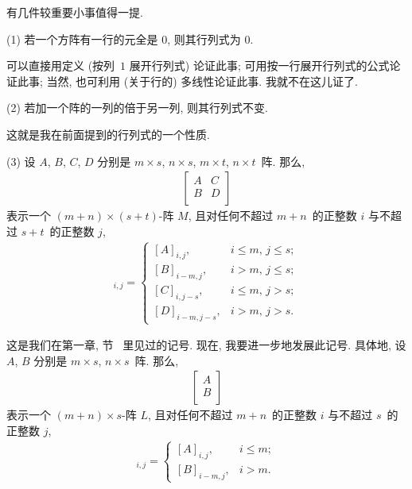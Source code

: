 有几件较重要小事值得一提.

(1)
若一个方阵有一行的元全是 \(0\),
则其行列式为 \(0\).

可以直接用定义 (按列~\(1\) 展开行列式) 论证此事;
可用按一行展开行列式的公式论证此事;
当然, 也可利用 (关于行的) 多线性论证此事.
我就不在这儿证了.

(2)
若加一个阵的一列的倍于另一列, 则其行列式不变.

这就是我在前面提到的行列式的一个性质.

(3)
设 \(A\), \(B\), \(C\), \(D\)
分别是 \(m \times s\), \(n \times s\),
\(m \times t\), \(n \times t\)~阵.
那么,
\begin{align*}
    \begin{bmatrix}
        A & C \\
        B & D \\
    \end{bmatrix}
\end{align*}
表示一个 \((m + n) \times (s + t)\)-阵 \(M\),
且对任何不超过 \(m + n\)~的正整数 \(i\)
与不超过 \(s + t\)~的正整数 \(j\),
\begin{align*}
    [M]_{i,j}
    = \begin{cases}
          [A]_{i,j},
           & \text{\(i \leq m\), \(j \leq s\)}; \\
          [B]_{i-m,j},
           & \text{\(i > m\), \(j \leq s\)};    \\
          [C]_{i,j-s},
           & \text{\(i \leq m\), \(j > s\)};    \\
          [D]_{i-m,j-s},
           & \text{\(i > m\), \(j > s\)}.
      \end{cases}
\end{align*}

这是我们在第一章, 节~ 里见过的记号.
现在, 我要进一步地发展此记号.
具体地,
设 \(A\), \(B\)
分别是 \(m \times s\), \(n \times s\)~阵.
那么,
\begin{align*}
    \begin{bmatrix}
        A \\
        B \\
    \end{bmatrix}
\end{align*}
表示一个 \((m + n) \times s\)-阵 \(L\),
且对任何不超过 \(m + n\)~的正整数 \(i\)
与不超过 \(s\)~的正整数 \(j\),
\begin{align*}
    [L]_{i,j}
    = \begin{cases}
          [A]_{i,j},
           & \text{\(i \leq m\)}; \\
          [B]_{i-m,j},
           & \text{\(i > m\)}.
      \end{cases}
\end{align*}

